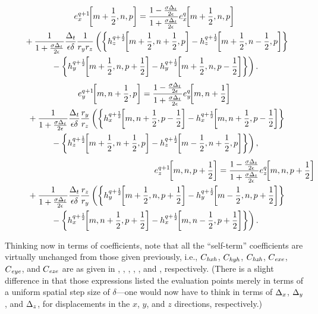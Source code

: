 \begin{multline}
  \fdtdh{e_x}{m+\half,n,p}{q+1} =
   \frac{1-\frac{\sigma\Delt}{2\epsilon}}{1+\frac{\sigma\Delt}{2\epsilon}}
   \fdtdh{e_x}{m+\half,n,p}{q} \\
   \hspace{.08in}\mbox{} +
   \frac{1}{1+\frac{\sigma\Delt}{2\epsilon}}
   \frac{\Delt}{\epsilon\delta}\frac{1}{r_yr_z}
   \left(
     \left\{
       \fdtdh{h_z}{m+\half,n+\half,p}{q+\half} -
       \fdtdh{h_z}{m+\half,n-\half,p}{q+\half}
     \right\}
   \right. \\
   \left. \mbox{} -
     \left\{
       \fdtdh{h_y}{m+\half,n,p+\half}{q+\half} -
       \fdtdh{h_y}{m+\half,n,p-\half}{q+\half}
     \right\}
   \right).
\end{multline}
\begin{multline}
  \fdtdh{e_y}{m,n+\half,p}{q+1} =
   \frac{1-\frac{\sigma\Delt}{2\epsilon}}{1+\frac{\sigma\Delt}{2\epsilon}}
   \fdtdh{e_y}{m,n+\half}{q} \\
   \hspace{.08in}\mbox{} +
   \frac{1}{1+\frac{\sigma\Delt}{2\epsilon}}
   \frac{\Delt}{\epsilon\delta}\frac{r_y}{r_z}
   \left(
     \left\{
       \fdtdh{h_x}{m,n+\half,p-\half}{q+\half} -
       \fdtdh{h_x}{m,n+\half,p-\half}{q+\half}
     \right\}
   \right. \\
   \left. \mbox{} -
     \left\{
       \fdtdh{h_z}{m+\half,n+\half,p}{q+\half} -
       \fdtdh{h_z}{m-\half,n+\half,p}{q+\half}
     \right\}
   \right),
\end{multline}
\begin{multline}
  \lefteqn{\fdtdh{e_z}{m,n,p+\half}{q+1} =
  \frac{1-\frac{\sigma\Delt}{2\epsilon}}{1+\frac{\sigma\Delt}{2\epsilon}}
  \fdtdh{e_z}{m,n,p+\half}{q}} \\
  \hspace{.08in}\mbox{} +
  \frac{1}{1+\frac{\sigma\Delt}{2\epsilon}}
  \frac{\Delt}{\epsilon\delta}\frac{r_z}{r_y}
  \left(
    \left\{
      \fdtdh{h_y}{m+\half,n,p+\half}{q+\half} -
      \fdtdh{h_y}{m-\half,n,p+\half}{q+\half}
    \right\}
  \right. \\
  \left. \mbox{} - 
    \left\{
      \fdtdh{h_x}{m,n+\half,p+\half}{q+\half} -
      \fdtdh{h_x}{m,n-\half,p+\half}{q+\half}
    \right\}
  \right).
\end{multline}

Thinking now in terms of coefficients, note that all the ``self-term''
coefficients are virtually unchanged from those given previously,
i.e., $C_{\mathit{hxh}}$, $C_{\mathit{hyh}}$, $C_{\mathit{hzh}}$, $C_{\mathit{exe}}$, $C_{\mathit{eye}}$, and $C_{\mathit{eze}}$ are as
given in , , ,
, , and ,
respectively.  (There is a slight difference in that those expressions
listed the evaluation points merely in terms of a uniform spatial step
size of $\delta$---one would now have to think in terms of $\Delta_x$,
$\Delta_y$, and $\Delta_z$, for displacements in the $x$, $y$, and $z$
directions, respectively.)


